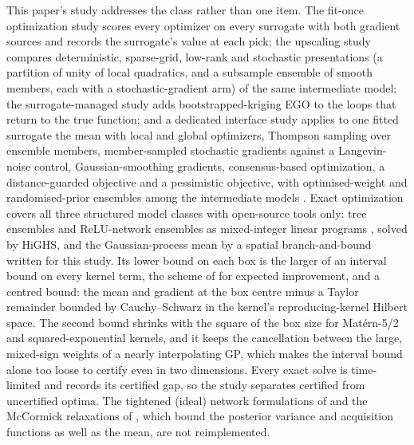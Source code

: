 This paper's study addresses the class rather than one item. The fit-once optimization study scores every optimizer on
every surrogate with both gradient sources and records the surrogate's value at each pick; the upscaling study
compares deterministic, sparse-grid, low-rank and stochastic presentations (a partition of unity of local quadratics,
and a subsample ensemble of smooth members, each with a stochastic-gradient arm) of the same intermediate model; the
surrogate-managed study adds bootstrapped-kriging EGO to the loops that return to the true function; and a dedicated
interface study applies to one fitted surrogate the mean with local and global optimizers, Thompson sampling over
ensemble members, member-sampled stochastic gradients against a Langevin-noise control, Gaussian-smoothing gradients,
consensus-based optimization, a distance-guarded objective and a pessimistic objective, with optimised-weight and
randomised-prior ensembles among the intermediate models \cite{acar2009ensemble,osband2018randomized}. Exact
optimization covers all three structured model classes with open-source tools only: tree ensembles and ReLU-network
ensembles as mixed-integer linear programs \cite{misic2020optimization,fischetti2018deep}, solved by HiGHS, and the
Gaussian-process mean by a spatial branch-and-bound written for this study. Its lower bound on each box is the larger
of an interval bound on every kernel term, the scheme of \citet{franey2011branch} for expected improvement, and a
centred bound: the mean and gradient at the box centre minus a Taylor remainder bounded by Cauchy--Schwarz in the
kernel's reproducing-kernel Hilbert space. The second bound shrinks with the square of the box size for Mat\'ern-5/2
and squared-exponential kernels, and it keeps the cancellation between the large, mixed-sign weights of a nearly
interpolating GP, which makes the interval bound alone too loose to certify even in two dimensions. Every exact solve
is time-limited and records its certified gap, so the study separates certified from uncertified optima. The
tightened (ideal) network formulations of \citet{anderson2020strong} and the McCormick relaxations of
\citet{schweidtmann2021deterministic}, which bound the posterior variance and acquisition functions as well as the
mean, are not reimplemented.
